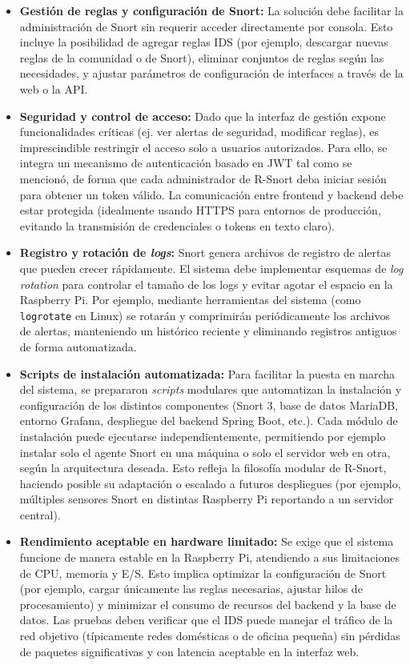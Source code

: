 \documentclass[11pt,a4paper,twoside]{report}
\begin{document}
\begin{itemize}
	\item \textbf{Gestión de reglas y configuración de Snort:} La solución debe facilitar la administración de Snort sin requerir acceder directamente por consola. Esto incluye la posibilidad de agregar reglas IDS (por ejemplo, descargar nuevas reglas de la comunidad o de Snort), eliminar conjuntos de reglas según las necesidades, y ajustar parámetros de configuración de interfaces a través de la web o la API.
	
	\item \textbf{Seguridad y control de acceso:} Dado que la interfaz de gestión expone funcionalidades críticas (ej. ver alertas de seguridad, modificar reglas), es imprescindible restringir el acceso solo a usuarios autorizados. Para ello, se integra un mecanismo de autenticación basado en JWT tal como se mencionó, de forma que cada administrador de R-Snort deba iniciar sesión para obtener un token válido. La comunicación entre frontend y backend debe estar protegida (idealmente usando HTTPS para entornos de producción, evitando la transmisión de credenciales o tokens en texto claro).
	
	\item \textbf{Registro y rotación de \emph{logs}:} Snort genera archivos de registro de alertas que pueden crecer rápidamente. El sistema debe implementar esquemas de \emph{log rotation} para controlar el tamaño de los logs y evitar agotar el espacio en la Raspberry Pi. Por ejemplo, mediante herramientas del sistema (como \texttt{logrotate} en Linux) se rotarán y comprimirán periódicamente los archivos de alertas, manteniendo un histórico reciente y eliminando registros antiguos de forma automatizada.
	
	\item \textbf{Scripts de instalación automatizada:} Para facilitar la puesta en marcha del sistema, se prepararon \emph{scripts} modulares que automatizan la instalación y configuración de los distintos componentes (Snort 3, base de datos MariaDB, entorno Grafana, despliegue del backend Spring Boot, etc.). Cada módulo de instalación puede ejecutarse independientemente, permitiendo por ejemplo instalar solo el agente Snort en una máquina o solo el servidor web en otra, según la arquitectura deseada. Esto refleja la filosofía modular de R-Snort, haciendo posible su adaptación o escalado a futuros despliegues (por ejemplo, múltiples sensores Snort en distintas Raspberry Pi reportando a un servidor central).
	
	\item \textbf{Rendimiento aceptable en hardware limitado:} Se exige que el sistema funcione de manera estable en la Raspberry Pi, atendiendo a sus limitaciones de CPU, memoria y E/S. Esto implica optimizar la configuración de Snort (por ejemplo, cargar únicamente las reglas necesarias, ajustar hilos de procesamiento) y minimizar el consumo de recursos del backend y la base de datos. Las pruebas deben verificar que el IDS puede manejar el tráfico de la red objetivo (típicamente redes domésticas o de oficina pequeña) sin pérdidas de paquetes significativas y con latencia aceptable en la interfaz web.
\end{itemize}
\end{document}
